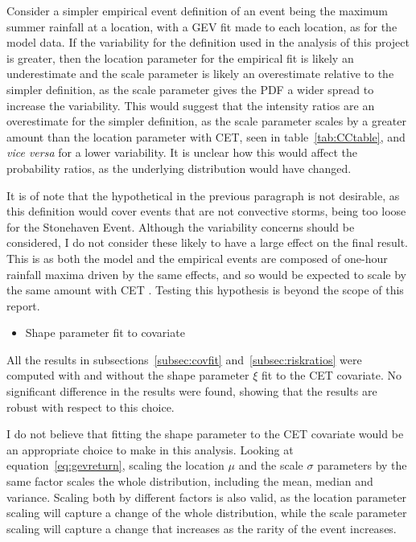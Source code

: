 Consider a simpler empirical event definition of an event being the maximum summer rainfall at a location,
    with a GEV fit made to each location, as for the model data.
If the variability for the definition used in the analysis of this project is greater,
    then the location parameter for the empirical fit is likely an underestimate and the scale parameter is likely
    an overestimate relative to the simpler definition,
    as the scale parameter gives the PDF a wider spread to increase the variability.
This would suggest that the intensity ratios are an overestimate for the simpler definition,
    as the scale parameter scales by a greater amount than the location parameter with CET,
    seen in table~\ref{tab:CCtable},
    and \textit{vice versa} for a lower variability.
It is unclear how this would affect the probability ratios,
    as the underlying distribution would have changed.

It is of note that the hypothetical in the previous paragraph is not desirable,
    as this definition would cover events that are not convective storms,
    being too loose for the Stonehaven Event.
Although the variability concerns should be considered,
    I do not consider these likely to have a large effect on the final result.
This is as both the model and the empirical events are composed of one-hour rainfall maxima driven by the same effects,
    and so would be expected to scale by the same amount with CET .
Testing this hypothesis is beyond the scope of this report.

\begin{itemize}\item Shape parameter fit to covariate\end{itemize}

All the results in subsections~\ref{subsec:covfit} and~\ref{subsec:riskratios} were computed with and without
    the shape parameter $\xi$ fit to the CET covariate.
No significant difference in the results were found,
    showing that the results are robust with respect to this choice.

I do not believe that fitting the shape parameter to the CET covariate would be an appropriate choice to make in this analysis.
Looking at equation~\ref{eq:gevreturn},
    scaling the location $\mu$ and the scale $\sigma$ parameters by the same factor scales the whole distribution,
    including the mean, median and variance.
Scaling both by different factors is also valid,
    as the location parameter scaling will capture a change of the whole distribution,
    while the scale parameter scaling will capture a change that increases as the rarity of the event increases.

